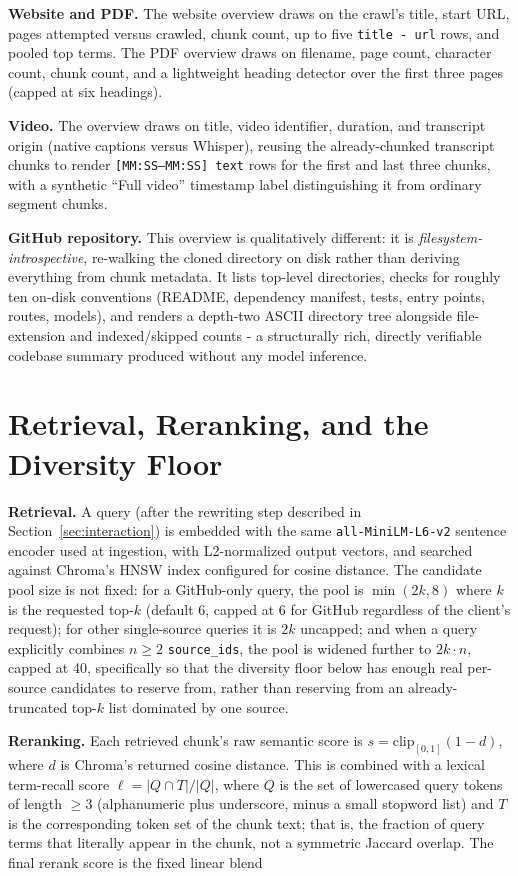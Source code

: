\documentclass[conference]{IEEEtran}
\begin{document}
\textbf{Website and PDF.} The website overview draws on the crawl's title, start URL, pages attempted versus crawled, chunk count, up to five \texttt{title - url} rows, and pooled top terms. The PDF overview draws on filename, page count, character count, chunk count, and a lightweight heading detector over the first three pages (capped at six headings).

\textbf{Video.} The overview draws on title, video identifier, duration, and transcript origin (native captions versus Whisper), reusing the already-chunked transcript chunks to render \texttt{[MM:SS--MM:SS] text} rows for the first and last three chunks, with a synthetic ``Full video'' timestamp label distinguishing it from ordinary segment chunks.

\textbf{GitHub repository.} This overview is qualitatively different: it is \emph{filesystem-introspective}, re-walking the cloned directory on disk rather than deriving everything from chunk metadata. It lists top-level directories, checks for roughly ten on-disk conventions (README, dependency manifest, tests, entry points, routes, models), and renders a depth-two ASCII directory tree alongside file-extension and indexed/skipped counts - a structurally rich, directly verifiable codebase summary produced without any model inference.

\section{Retrieval, Reranking, and the Diversity Floor}
\label{sec:retrieval}

\textbf{Retrieval.} A query (after the rewriting step described in Section~\ref{sec:interaction}) is embedded with the same \texttt{all-MiniLM-L6-v2} sentence encoder used at ingestion, with L2-normalized output vectors, and searched against Chroma's HNSW index configured for cosine distance. The candidate pool size is not fixed: for a GitHub-only query, the pool is $\min(2 k, 8)$ where $k$ is the requested top-$k$ (default 6, capped at 6 for GitHub regardless of the client's request); for other single-source queries it is $2k$ uncapped; and when a query explicitly combines $n \geq 2$ \texttt{source\_ids}, the pool is widened further to $2k \cdot n$, capped at 40, specifically so that the diversity floor below has enough real per-source candidates to reserve from, rather than reserving from an already-truncated top-$k$ list dominated by one source.

\textbf{Reranking.} Each retrieved chunk's raw semantic score is $s = \mathrm{clip}_{[0,1]}(1 - d)$, where $d$ is Chroma's returned cosine distance. This is combined with a lexical term-recall score $\ell = |Q \cap T| / |Q|$, where $Q$ is the set of lowercased query tokens of length $\geq 3$ (alphanumeric plus underscore, minus a small stopword list) and $T$ is the corresponding token set of the chunk text; that is, the fraction of query terms that literally appear in the chunk, not a symmetric Jaccard overlap. The final rerank score is the fixed linear blend
\end{document}
